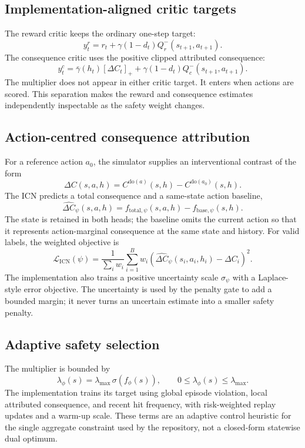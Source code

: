 \documentclass[10pt]{article}
\begin{document}
\subsection{Implementation-aligned critic targets}
The reward critic keeps the ordinary one-step target:
\begin{equation}
y^r_t=r_t+\gamma(1-d_t)Q_r^-(s_{t+1},a_{t+1}).
\label{eq:reward-target}
\end{equation}
The consequence critic uses the positive clipped attributed consequence:
\begin{equation}
y^c_t=\bar\gamma(h_t)[\Delta C_t]_+ +
\gamma(1-d_t)Q_c^-(s_{t+1},a_{t+1}).
\label{eq:qc}
\end{equation}
The multiplier does not appear in either critic target. It enters when actions
are scored. This separation makes the reward and consequence estimates
independently inspectable as the safety weight changes.

\subsection{Action-centred consequence attribution}
For a reference action $a_0$, the simulator supplies an interventional
contrast of the form
\begin{equation}
\Delta C(s,a,h)=C^{\mathrm{do}(a)}(s,h)-
C^{\mathrm{do}(a_0)}(s,h).
\label{eq:contrast}
\end{equation}
The ICN predicts a total consequence and a same-state action baseline,
\begin{equation}
\widehat{\Delta C}_\psi(s,a,h)=
f_{\mathrm{total},\psi}(s,a,h)-f_{\mathrm{base},\psi}(s,h).
\end{equation}
The state is retained in both heads; the baseline omits the current action so
that it represents action-marginal consequence at the same state and history.
For valid labels, the weighted objective is
\begin{equation}
\mathcal{L}_{\mathrm{ICN}}(\psi)=
\frac{1}{\sum_iw_i}\sum_{i=1}^{B}w_i
\left(\widehat{\Delta C}_\psi(s_i,a_i,h_i)-\Delta C_i\right)^2.
\end{equation}
The implementation also trains a positive uncertainty scale $\sigma_\psi$
with a Laplace-style error objective. The uncertainty is used by the penalty
gate to add a bounded margin; it never turns an uncertain estimate into a
smaller safety penalty.

\subsection{Adaptive safety selection}
The multiplier is bounded by
\begin{equation}
\lambda_\phi(s)=\lambda_{\max}\,\sigma(f_\phi(s)),
\qquad 0\le\lambda_\phi(s)\le\lambda_{\max}.
\end{equation}
The implementation trains its target using global episode violation, local
attributed consequence, and recent hit frequency, with risk-weighted replay
updates and a warm-up scale. These terms are an adaptive control heuristic for
the single aggregate constraint used by the repository, not a closed-form
statewise dual optimum.
\end{document}
